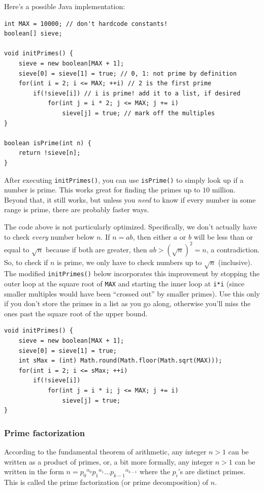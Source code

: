 \documentclass[a4paper,12pt]{article}
\begin{document}
Here's a possible Java implementation:

\begin{lstlisting}
int MAX = 10000; // don't hardcode constants!
boolean[] sieve;

void initPrimes() {
	sieve = new boolean[MAX + 1];
	sieve[0] = sieve[1] = true; // 0, 1: not prime by definition
	for(int i = 2; i <= MAX; ++i) // 2 is the first prime
		if(!sieve[i]) // i is prime! add it to a list, if desired
			for(int j = i * 2; j <= MAX; j += i)
				sieve[j] = true; // mark off the multiples
}

boolean isPrime(int n) {
	return !sieve[n];
}
\end{lstlisting}

\noindent After executing \lstinline/initPrimes()/, you can use \lstinline/isPrime()/ to simply look up if a number is prime. This works great for finding the primes up to $10$ million. Beyond that, it still works, but unless you {\em need} to know if every number in some range is prime, there are probably faster ways.

The code above is not particularly optimized. Specifically, we don't actually have to check {\em every} number below $n$. If $n=ab$, then either $a$ or $b$ will be less than or equal to $\sqrt{n}$ because if both are greater, then $ab>\left(\sqrt{n}\right)^2=n$, a contradiction. So, to check if $n$ is prime, we only have to check numbers up to $\sqrt{n}$ (inclusive). The modified \lstinline/initPrimes()/ below incorporates this improvement by stopping the outer loop at the square root of \lstinline/MAX/ and starting the inner loop at \lstinline/i*i/ (since smaller multiples would have been ``crossed out'' by smaller primes). Use this only if you don't store the primes in a list as you go along, otherwise you'll miss the ones past the square root of the upper bound.

\begin{lstlisting}
void initPrimes() {
	sieve = new boolean[MAX + 1];
	sieve[0] = sieve[1] = true;
	int sMax = (int) Math.round(Math.floor(Math.sqrt(MAX)));
	for(int i = 2; i <= sMax; ++i)
		if(!sieve[i])
			for(int j = i * i; j <= MAX; j += i)
				sieve[j] = true;
}
\end{lstlisting}

\subsubsection{Prime factorization}

According to the fundamental theorem of arithmetic, any integer $n>1$ can be written as a product of primes, or, a bit more formally, any integer $n>1$ can be written in the form $n={p_0}^{\alpha_0}{p_1}^{\alpha_1}\ldots{p_{k-1}}^{\alpha_{k-1}}$ where the $p_i$'s are distinct primes. This is called the prime factorization (or prime decomposition) of $n$.
\end{document}
